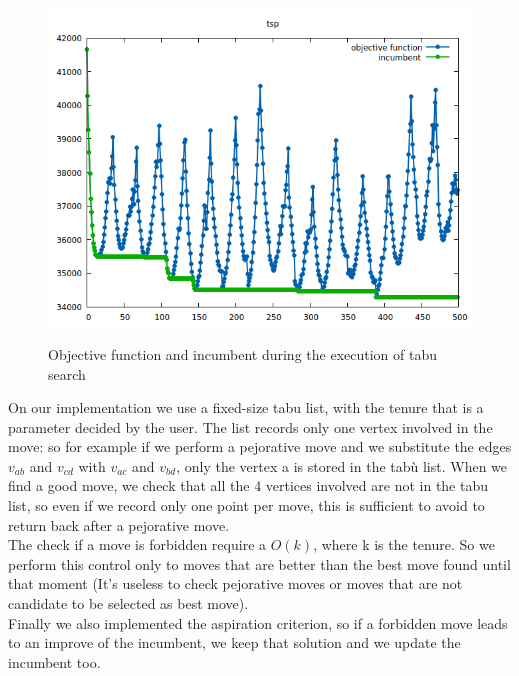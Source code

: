 \begin{figure}[h!]
\centering
	\includegraphics[scale=0.6]{media/tabuSearch1.png} \\
	\caption{Objective function and incumbent during the execution of tabu search}
\end{figure}

\noindent On our implementation we use a fixed-size tabu list, with the tenure that is a parameter decided by the user. The list records only one vertex involved in the move: so for example if we perform a pejorative move and we substitute the edges $v_{ab}$ and $v_{cd}$ with $v_{ac}$ and $v_{bd}$, only the vertex a is stored in the tabù list. When we find a good move, we check that all the 4 vertices involved are not in the tabu list, so even if we record only one point per move, this is sufficient to avoid to return back after a pejorative move. \\
The check if a move is forbidden require a $O(k)$, where k is the tenure. So we perform this control only to moves that are better than the best move found until that moment (It's useless to check pejorative moves or moves that are not candidate to be selected as best move). \\
Finally we also implemented the aspiration criterion, so if a forbidden move leads to an improve of the incumbent, we keep that solution and we update the incumbent too.


